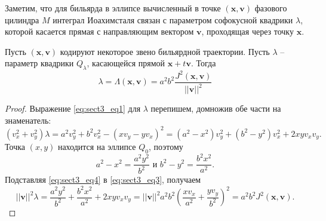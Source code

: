Заметим, что для бильярда в эллипсе вычисленный в точке $(\mathbf{x}, \mathbf{v})$ фазового цилиндра $M$ интеграл Иоахимсталя связан с параметром софокусной квадрики $\lambda$, которой касается прямая с направляющим вектором $\mathbf{v}$, проходящая через точку $\mathbf{x}$.

\begin{statement}
    Пусть $(\mathbf{x}, \mathbf{v})$ кодируют некоторое звено бильярдной траектории. Пусть $\lambda$ -- параметр квадрики $Q_\lambda$, касающейся прямой $\mathbf{x} +t \mathbf{v}$. Тогда 
    \begin{equation}
        \lambda = \Lambda(\mathbf{x}, \mathbf{v}) =  a^2 b^2 \frac{J^2(\mathbf{x}, \mathbf{v})}{||\mathbf{v}||^2}
    \label{eq:sect3_eq2}
    \end{equation}
\end{statement}

\begin{proof}
Выражение \eqref{eq:sect3_eq1} для $\lambda$ перепишем, домножив обе части на знаменатель:
\begin{equation}
(v_x^2 + v_y^2)\lambda = a^2 v_y^2 + b^2v_x^2 - (x v_y-y v_x)^2 = (a^2-x^2)v_y^2 + (b^2-y^2)v_x^2 + 2 x y v_x v_y.
\label{eq:sect3_eq3}
\end{equation}
Точка $(x, y)$ находится на эллипсе $Q_0$, поэтому
\begin{equation}
a^2 - x^2 = \frac{a^2 y^2}{b^2} \text{  и } b^2 - y^2 = \frac{b^2 x^2}{a^2}.
\label{eq:sect3_eq4}
\end{equation}
Подставляя \eqref{eq:sect3_eq4} в \eqref{eq:sect3_eq3}, получаем
$$||\mathbf{v}||^2 \lambda = \frac{a^2y^2}{b^2} + \frac{b^2 x^2}{a^2} + 2 x y v_x v_y = ||\mathbf{v}||^2 a^2b^2 \left( \frac{x v_x}{a^2} + \frac{y v_y}{b^2}\right)^2 = a^2b^2J^2(\mathbf{x}, \mathbf{v}).$$
\end{proof}

